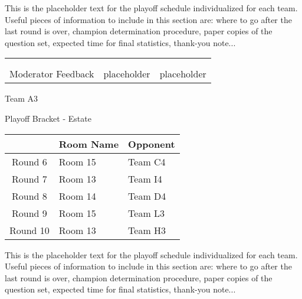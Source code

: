 \documentclass{article}%
\begin{document}
\vspace*{30pt}%
\linebreak%
This is the placeholder text for the playoff schedule individualized for each team. Useful pieces of information to include in this section are: where to go after the last round is over, champion determination procedure, paper copies of the question set, expected time for final statistics, thank{-}you note...%
\vspace*{30pt}%
\newline%
%
\begin{tabularx}{\textwidth}{YYY}%
  &  &  \\%
\\%
Moderator Feedback&placeholder&placeholder\\%
\end{tabularx}%
\newpage%
\begin{center}%
\begin{Huge}%
Team A3%
\end{Huge}%
\vspace*{12pt}%
\linebreak%
\begin{Large}%
Playoff Bracket {-} Estate%
\end{Large}%
\end{center}%
\vspace*{4pt}%
%
\begin{tabularx}{\textwidth}{|c|Y|Y|}%
\hline%
&Room Name&Opponent\\%
\hline%
Round 6&Room 15&Team C4\\%
Round 7&Room 13&Team I4\\%
Round 8&Room 14&Team D4\\%
Round 9&Room 15&Team L3\\%
Round 10&Room 13&Team H3\\%
\hline%
\end{tabularx}%
\vspace*{30pt}%
\linebreak%
This is the placeholder text for the playoff schedule individualized for each team. Useful pieces of information to include in this section are: where to go after the last round is over, champion determination procedure, paper copies of the question set, expected time for final statistics, thank{-}you note...%
\vspace*{30pt}%
\end{document}

